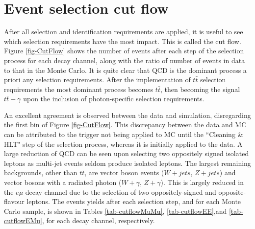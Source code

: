 \section{Event selection cut flow} \label{sec-cutflow}

After all selection and identification requirements are applied, it is useful to see which selection requirements have the most impact. This is called the cut flow. Figure \ref{fig-CutFlow} shows the number of events after each step of the selection process for each decay channel, along with the ratio of number of events in data to that in the Monte Carlo. It is quite clear that QCD is the dominant process a priori any selection requirements. After the implementation of $t\bar{t}$ selection requirements the most dominant process becomes $t\bar{t}$, then becoming the signal $t\bar{t}+\gamma$ upon the inclusion of photon-specific selection requirements. 

An excellent agreement is observed between the data and simulation, disregarding the first bin of Figure \ref{fig-CutFlow}. This discrepancy between the data and MC can be attributed to the trigger not being applied to MC until the ``Cleaning \& HLT" step of the selection process, whereas it is initially applied to the data. A large reduction of QCD can be seen upon selecting two oppositely signed isolated leptons as multi-jet events seldom produce isolated leptons. The largest remaining backgrounds, other than $t\bar{t}$, are vector boson events ($W+jets$, $Z+jets$) and vector bosons with a radiated photon ($W+\gamma$, $Z+\gamma$). This is largely reduced in the $e\mu$ decay channel due to the selection of two oppositely-signed and opposite-flavour leptons. The events yields after each selection step, and for each Monte Carlo sample, is shown in Tables \ref{tab-cutflowMuMu}, \ref{tab-cutflowEE},and \ref{tab-cutflowEMu}, for each decay channel, respectively. 

